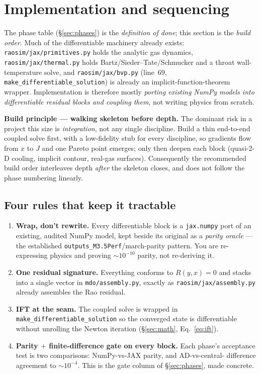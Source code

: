 \documentclass[11pt]{article}
\newcommand{\cmd}[1]{\nolinkurl{#1}}
\begin{document}
\section{Implementation and sequencing}
\label{sec:impl}

The phase table (\S\ref{sec:phases}) is the \emph{definition of done}; this
section is the \emph{build order}. Much of the differentiable machinery already
exists: \cmd{raosim/jax/primitives.py} holds the analytic gas dynamics,
\cmd{raosim/jax/thermal.py} holds Bartz/Sieder--Tate/Schmucker and a throat
wall-temperature solve, and \cmd{raosim/jax/bvp.py} (line~69,
\cmd{make\_differentiable\_solution}) is already an implicit-function-theorem
wrapper. Implementation is therefore mostly \emph{porting existing NumPy models
into differentiable residual blocks and coupling them}, not writing physics from
scratch.

\begin{keybox}
\textbf{Build principle --- walking skeleton before depth.} The dominant risk in
a project this size is \emph{integration}, not any single discipline. Build a
thin end-to-end coupled solve first, with a low-fidelity stub for every
discipline, so gradients flow from $x$ to $J$ and one Pareto point emerges; only
then deepen each block (quasi-2-D cooling, implicit contour, real-gas surfaces).
Consequently the recommended build order interleaves depth \emph{after} the
skeleton closes, and does not follow the phase numbering linearly.
\end{keybox}

\subsection{Four rules that keep it tractable}
\begin{enumerate}[leftmargin=1.5em,itemsep=3pt]
\item \textbf{Wrap, don't rewrite.} Every differentiable block is a \cmd{jax.numpy}
port of an existing, audited NumPy model, kept beside its original as a
\emph{parity oracle} --- the established \cmd{outputs\_M3.5Perf}/march-parity
pattern. You are re-expressing physics and proving $\sim\!10^{-10}$ parity, not
re-deriving it.
\item \textbf{One residual signature.} Everything conforms to $R(y,x)=0$ and
stacks into a single vector in \cmd{mdo/assembly.py}, exactly as
\cmd{raosim/jax/assembly.py} already assembles the Rao residual.
\item \textbf{IFT at the seam.} The coupled solve is wrapped in
\cmd{make\_differentiable\_solution} so the converged state is differentiable
without unrolling the Newton iteration (\S\ref{sec:math}, Eq.~\eqref{eq:ift}).
\item \textbf{Parity $+$ finite-difference gate on every block.} Each phase's
acceptance test is two comparisons: NumPy-vs-JAX parity, and AD-vs-central-
difference agreement to $\sim\!10^{-4}$. This is the gate column of
\S\ref{sec:phases}, made concrete.
\end{enumerate}
\end{document}
